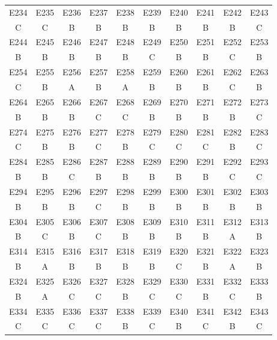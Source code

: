 \documentclass[withoutpreface,bwprint]{cumcmthesis} %
\begin{document}
\begin{appendices}
\begin{table}[h]
\begin{center}
\begin{tabular}{|c|c|c|c|c|c|c|c|c|c|}
		\end{tabular}
	\end{center}
\end{table}
\begin{table}[h]
	\begin{center}
		\begin{tabular}{|c|c|c|c|c|c|c|c|c|c|}
			\hline
			E234 & E235 & E236 & E237 & E238 & E239 & E240 & E241 & E242 & E243 \\ 
			C & C & B & B & B & B & B & B & B & C \\ \hline
			E244 & E245 & E246 & E247 & E248 & E249 & E250 & E251 & E252 & E253 \\ 
			B & B & B & B & B & C & B & B & C & B \\ \hline
			E254 & E255 & E256 & E257 & E258 & E259 & E260 & E261 & E262 & E263 \\ 
			C & B & A & B & A & B & B & B & C & B \\ \hline
			E264 & E265 & E266 & E267 & E268 & E269 & E270 & E271 & E272 & E273 \\ 
			B & B & B & C & C & B & B & B & B & C \\ \hline
			E274 & E275 & E276 & E277 & E278 & E279 & E280 & E281 & E282 & E283 \\ 
			C & B & B & C & B & C & C & C & B & C \\ \hline
			E284 & E285 & E286 & E287 & E288 & E289 & E290 & E291 & E292 & E293 \\ 
			B & B & C & B & B & B & B & B & C & C \\ \hline
			E294 & E295 & E296 & E297 & E298 & E299 & E300 & E301 & E302 & E303 \\ 
			B & B & B & C & B & B & B & B & B & B \\ \hline
			E304 & E305 & E306 & E307 & E308 & E309 & E310 & E311 & E312 & E313 \\ 
			B & C & B & C & B & B & B & B & A & B \\ \hline
			E314 & E315 & E316 & E317 & E318 & E319 & E320 & E321 & E322 & E323 \\ 
			B & A & B & B & B & B & C & B & A & B \\ \hline
			E324 & E325 & E326 & E327 & E328 & E329 & E330 & E331 & E332 & E333 \\ 
			B & A & C & C & B & C & C & B & C & B \\ \hline
			E334 & E335 & E336 & E337 & E338 & E339 & E340 & E341 & E342 & E343 \\ 
			C & C & C & C & B & C & B & C & B & C \\ \hline
		\end{tabular}
	\end{center}
\end{table}


\end{appendices}
\end{document}
